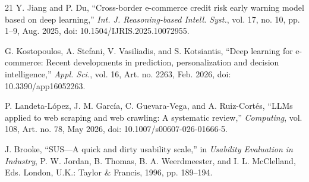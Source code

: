 \begin{thebibliography}{21}
 Y. Jiang and P. Du, ``Cross-border e-commerce credit risk early warning model based on deep learning,'' \textit{Int. J. Reasoning-based Intell. Syst.}, vol. 17, no. 10, pp. 1--9, Aug. 2025, doi: 10.1504/IJRIS.2025.10072955.

 G. Kostopoulos, A. Stefani, V. Vasiliadis, and S. Kotsiantis, ``Deep learning for e-commerce: Recent developments in prediction, personalization and decision intelligence,'' \textit{Appl. Sci.}, vol. 16, Art. no. 2263, Feb. 2026, doi: 10.3390/app16052263.

 P. Landeta-L\'opez, J. M. Garc\'ia, C. Guevara-Vega, and A. Ruiz-Cort\'es, ``LLMs applied to web scraping and web crawling: A systematic review,'' \textit{Computing}, vol. 108, Art. no. 78, May 2026, doi: 10.1007/s00607-026-01666-5.

 J. Brooke, ``SUS---A quick and dirty usability scale,'' in \textit{Usability Evaluation in Industry}, P. W. Jordan, B. Thomas, B. A. Weerdmeester, and I. L. McClelland, Eds. London, U.K.: Taylor \& Francis, 1996, pp. 189--194.


\end{thebibliography}
